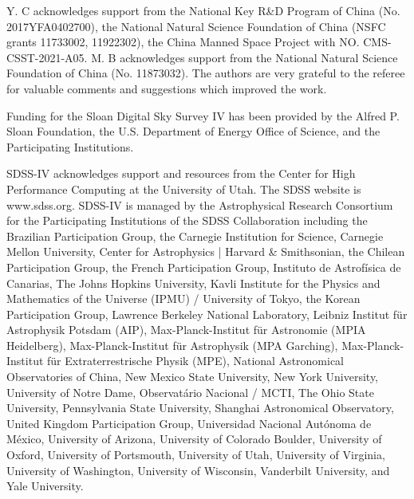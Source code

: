 \documentclass{aastex631}
\begin{document}
\begin{acknowledgments}
    Y. C acknowledges support from the National Key R\&D Program of China (No. 2017YFA0402700), the National Natural Science Foundation of China (NSFC grants 11733002, 11922302), the China Manned Space Project with NO. CMS-CSST-2021-A05. M. B acknowledges support from the National Natural Science Foundation of China (No. 11873032). The authors are very grateful to the referee for valuable comments and suggestions which improved the work.

    Funding for the Sloan Digital Sky Survey IV has been provided by the Alfred P. Sloan Foundation, the U.S. Department of Energy Office of Science, and the Participating Institutions. 

    SDSS-IV acknowledges support and resources from the Center for High Performance Computing  at the University of Utah. The SDSS website is www.sdss.org. SDSS-IV is managed by the Astrophysical Research Consortium for the Participating Institutions of the SDSS Collaboration including the Brazilian Participation Group, the Carnegie Institution for Science, Carnegie Mellon University, Center for Astrophysics | Harvard \& Smithsonian, the Chilean Participation Group, the French Participation Group, Instituto de Astrof\'isica de Canarias, The Johns Hopkins University, Kavli Institute for the Physics and Mathematics of the Universe (IPMU) / University of Tokyo, the Korean Participation Group, Lawrence Berkeley National Laboratory, Leibniz Institut f\"ur Astrophysik Potsdam (AIP),  Max-Planck-Institut f\"ur Astronomie (MPIA Heidelberg), Max-Planck-Institut f\"ur Astrophysik (MPA Garching), Max-Planck-Institut f\"ur Extraterrestrische Physik (MPE), National Astronomical Observatories of China, New Mexico State University, New York University, University of Notre Dame, Observat\'ario Nacional / MCTI, The Ohio State University, Pennsylvania State University, Shanghai Astronomical Observatory, United Kingdom Participation Group, Universidad Nacional Aut\'onoma de M\'exico, University of Arizona, University of Colorado Boulder, University of Oxford, University of Portsmouth, University of Utah, University of Virginia, University of Washington, University of Wisconsin, Vanderbilt University, and Yale University.
\end{acknowledgments}
\end{document}
